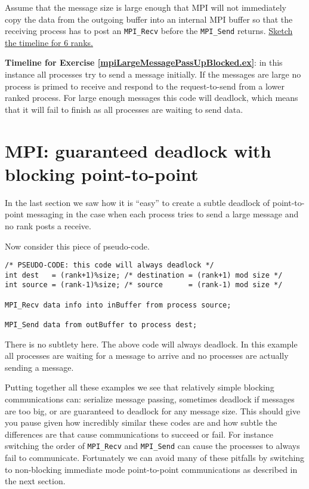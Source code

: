 \begin{Exercise}
\label{mpiLargeMessagePassUpBlocked.ex}
Assume that the message size is large enough that MPI will not immediately copy the data from the outgoing buffer into an internal MPI buffer so that the receiving process has to post an \texttt{MPI\_Recv} before the \texttt{MPI\_Send} returns. \underline{Sketch the timeline for 6 ranks.}
\end{Exercise}

\begin{Answer}
{\bf Timeline for Exercise \ref{mpiLargeMessagePassUpBlocked.ex}}: in this instance all processes try to send a message initially. If the messages are large no process is primed to receive and respond to the request-to-send from a lower ranked process. For large enough messages this code will deadlock, which means that it will fail to finish as all processes are waiting to send data.
\end{Answer}

\section{MPI: guaranteed deadlock with blocking point-to-point}
\label{mpiDeadlock.sec}

In the last section we saw how it is ``easy'' to create a subtle deadlock of point-to-point messaging in the case when each process tries to send a large message and no rank posts a receive.

Now consider this piece of pseudo-code.


\begin{verbatim}
/* PSEUDO-CODE: this code will always deadlock */
int dest   = (rank+1)%size; /* destination = (rank+1) mod size */
int source = (rank-1)%size; /* source      = (rank-1) mod size */

MPI_Recv data info into inBuffer from process source;

MPI_Send data from outBuffer to process dest;
\end{verbatim}

There is no subtlety here. The above code will always deadlock. In this example all processes are waiting for a message to arrive and no processes are actually sending a message. 

Putting together all these examples we see that relatively simple blocking communications can: serialize message passing, sometimes deadlock if messages are too big, or are guaranteed to deadlock for any message size. This should give you pause given how incredibly similar these codes are and how subtle the differences are that cause communications to succeed or fail. For instance switching the order of \texttt{MPI\_Recv} and \texttt{MPI\_Send} can cause the processes to always fail to communicate. Fortunately we can avoid many of these pitfalls by switching to non-blocking immediate mode point-to-point communications as described in the next section.

